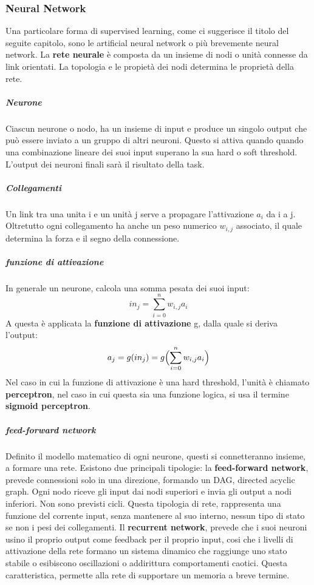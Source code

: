 \documentclass[14pt]{extarticle}
\begin{document}
\subsubsection{Neural Network}
Una particolare forma di supervised learning, come ci suggerisce il titolo del seguite capitolo, sono le artificial neural network o più brevemente neural network. 
La \textbf{rete neurale} è composta da un insieme di nodi o unità connesse da link orientati.\cite{russell2005intelligenza}
 La topologia e le propietà dei nodi determina le proprietà della rete.
\subparagraph{Neurone}
Ciascun neurone o nodo, ha un insieme di input e produce un singolo output che può essere inviato a un gruppo di altri neuroni. Questo si attiva quando quando una combinazione lineare dei suoi input superano la sua hard o soft threshold. L'output dei neuroni finali sarà il risultato della task.
\subparagraph{Collegamenti}
Un link tra una unita i e un unità j serve a propagare l'attivazione $a_{i}$ da i a j. Oltretutto ogni collegamento ha anche un peso numerico $w_{i,j}$ associato, il quale determina la forza e il segno della connessione.
\subparagraph{funzione di attivazione}
In generale un neurone, calcola una somma pesata dei suoi input:
\[in_j=\sum_{i=0}^n  w_{i,j}a_{i}\]
A questa è applicata la \textbf{funzione di attivazione} g, dalla quale si deriva l'output:
\[a_j=g(in_j)=g \Bigl (\sum_{i=0}^n  w_{i,j}a_{i} \Bigr )\]
Nel caso in cui la funzione di attivazione è una hard threshold, l'unità è chiamato \textbf{perceptron}, nel caso in cui questa sia una funzione logica, si usa il termine \textbf{sigmoid perceptron}.
\subparagraph{feed-forward network}
Definito il modello matematico di ogni neurone, questi si connetteranno insieme, a formare una rete.
Esistono due principali tipologie: 
la \textbf{feed-forward network}, prevede connessioni solo in una direzione, formando un DAG, directed acyclic graph. Ogni nodo riceve gli input dai nodi superiori e invia gli output a nodi inferiori. Non sono previsti cicli. Questa tipologia di rete, rappresenta una funzione del corrente input, senza mantenere al suo interno, nessun tipo di stato se non i pesi dei collegamenti.
Il \textbf{recurrent network}, prevede che i suoi neuroni usino il proprio output come feedback per il proprio input, cosi che i livelli di attivazione della rete formano un sistema dinamico che raggiunge uno stato stabile o
esibiscono oscillazioni o addirittura comportamenti caotici. Questa caratteristica, permette alla rete di supportare un memoria a breve termine.

\end{document}
